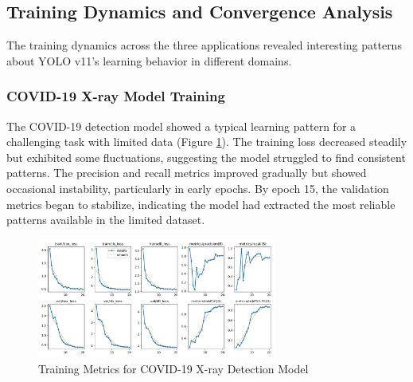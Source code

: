 \begin{multicols}{2}
\subsection{Training Dynamics and Convergence Analysis}

The training dynamics across the three applications revealed interesting patterns about YOLO v11's learning behavior in different domains.

\subsubsection{COVID-19 X-ray Model Training}

The COVID-19 detection model showed a typical learning pattern for a challenging task with limited data (Figure \ref{fig:covid_training}). The training loss decreased steadily but exhibited some fluctuations, suggesting the model struggled to find consistent patterns. The precision and recall metrics improved gradually but showed occasional instability, particularly in early epochs. By epoch 15, the validation metrics began to stabilize, indicating the model had extracted the most reliable patterns available in the limited dataset.
\end{multicols}

\begin{figure}[ht]
\centering
\includegraphics[width=0.7\textwidth]{datas/x_ray_summary_datas/x_ray_results.png}
\caption{Training Metrics for COVID-19 X-ray Detection Model}
\label{fig:covid_training}
\end{figure}

